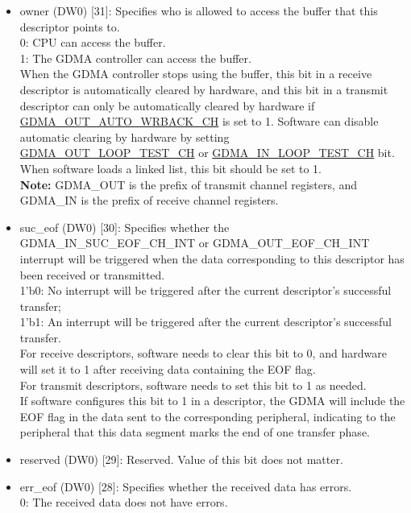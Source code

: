 \documentclass[main\_\_EN.tex]{subfiles}
\begin{document}
\begin{itemize}
    \item owner (DW0) [31]: Specifies who is allowed to access the buffer that this descriptor points to.\\
    0: CPU can access the buffer. \\
    1: The GDMA controller can access the buffer.\\
    When the GDMA controller stops using the buffer, this bit in a receive descriptor is automatically cleared by hardware, and this bit in a transmit descriptor can only be automatically cleared by hardware if \hyperref[fielddesc:GDMAOUTAUTOWRBACKCHN]{GDMA\_OUT\_AUTO\_WRBACK\_CH} is set to 1. Software can disable automatic clearing by hardware by setting \hyperref[fielddesc:GDMAOUTLOOPTESTCHN]{GDMA\_OUT\_LOOP\_TEST\_CH} or \hyperref[fielddesc:GDMAINLOOPTESTCHN]{GDMA\_IN\_LOOP\_TEST\_CH} bit. When software loads a linked list, this bit should be set to 1.
    \\{\bfseries Note:} GDMA\_OUT is the prefix of transmit channel registers, and GDMA\_IN is the prefix of receive channel registers.
    \item suc\_eof (DW0) [30]: Specifies whether the GDMA\_IN\_SUC\_EOF\_CH\_INT or GDMA\_OUT\_EOF\_CH\_INT interrupt will be triggered when the data corresponding to this descriptor has been received or transmitted.\\
    1'b0: No interrupt will be triggered after the current descriptor's successful transfer;\\
    1'b1: An interrupt will be triggered after the current descriptor's successful transfer.\\
    For receive descriptors, software needs to clear this bit to 0, and hardware will set it to 1 after receiving data containing the EOF flag.\\
    For transmit descriptors, software needs to set this bit to 1 as needed.\\
    If software configures this bit to 1 in a descriptor, the GDMA will include the EOF flag in the data sent to the corresponding peripheral, indicating to the peripheral that this data segment marks the end of one transfer phase.
    \item reserved (DW0) [29]: Reserved. Value of this bit does not matter.
    \item err\_eof (DW0) [28]: Specifies whether the received data has errors.\\
    0: The received data does not have errors.\\

\end{itemize}
\end{document}
